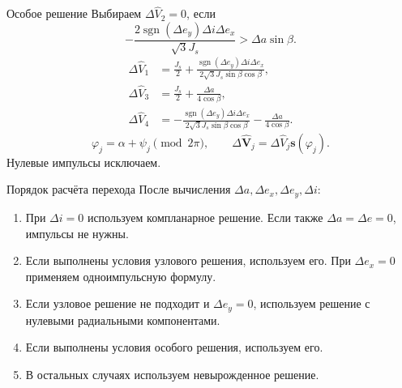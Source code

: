 \documentclass[11pt,aspectratio=169,t]{beamer}
\newcommand{\derivationmathspacing}{%
  \setlength{\abovedisplayskip}{2pt}%
  \setlength{\belowdisplayskip}{3pt}%
  \setlength{\abovedisplayshortskip}{2pt}%
  \setlength{\belowdisplayshortskip}{2pt}%
  \setlength{\jot}{2pt}}
\begin{document}
\begin{frame}{Особое решение}
\relax
\derivationmathspacing
Выбираем $\Delta\widehat V_2=0$, если
\[
-\frac{2\operatorname{sgn}(\Delta e_y)\Delta i\Delta e_x}{\sqrt3J_s}
>\Delta a\sin\beta.
\]
\[
\begin{aligned}
\Delta\widehat V_1&=\frac{J_s}{2}
+\frac{\operatorname{sgn}(\Delta e_y)\Delta i\Delta e_x}
{2\sqrt3J_s\sin\beta\cos\beta},\\
\Delta\widehat V_3&=\frac{J_s}{2}+\frac{\Delta a}{4\cos\beta},\\
\Delta\widehat V_4&=-\frac{\operatorname{sgn}(\Delta e_y)\Delta i\Delta e_x}
{2\sqrt3J_s\sin\beta\cos\beta}
-\frac{\Delta a}{4\cos\beta}.
\end{aligned}
\]
\[
\varphi_j=\alpha+\psi_j\pmod{2\pi},\qquad
\Delta\widehat{\boldsymbol V}_j=
\Delta\widehat V_j\boldsymbol s(\varphi_j).
\]
\medskip
\justifying
Нулевые импульсы исключаем.
\end{frame}

\begin{frame}{Порядок расчёта перехода}
\relax
\derivationmathspacing
После вычисления $\Delta a,\Delta e_x,\Delta e_y,\Delta i$:
\begin{enumerate}
\item При $\Delta i=0$ используем компланарное решение.
Если также $\Delta a=\Delta e=0$, импульсы не нужны.
\item Если выполнены условия узлового решения, используем его.
При $\Delta e_x=0$ применяем одноимпульсную формулу.
\item Если узловое решение не подходит и $\Delta e_y=0$,
используем решение с нулевыми радиальными компонентами.
\item Если выполнены условия особого решения, используем его.
\item В остальных случаях используем невырожденное решение.
\end{enumerate}
\end{frame}

\begin{frame}[plain]
\end{frame}
\end{document}
